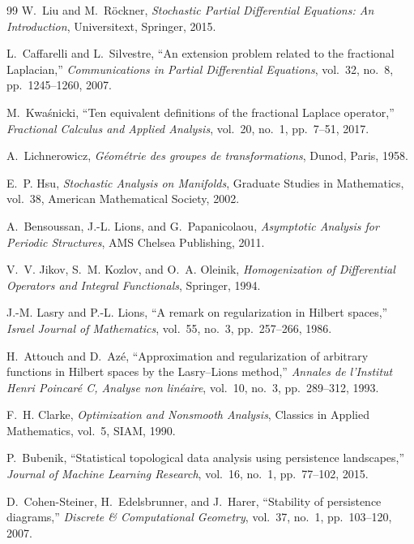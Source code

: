 \documentclass[11pt,a4paper,reqno]{article}
\theoremstyle{definition}
\theoremstyle{remark}
\begin{document}
\begin{thebibliography}{99}
W.~Liu and M.~R\"ockner,
\emph{Stochastic Partial Differential Equations: An Introduction},
Universitext, Springer, 2015.

L.~Caffarelli and L.~Silvestre,
``An extension problem related to the fractional Laplacian,''
\emph{Communications in Partial Differential Equations}, vol.~32, no.~8, pp.~1245--1260, 2007.

M.~Kwa\'snicki,
``Ten equivalent definitions of the fractional Laplace operator,''
\emph{Fractional Calculus and Applied Analysis}, vol.~20, no.~1, pp.~7--51, 2017.

A.~Lichnerowicz,
\emph{G\'eom\'etrie des groupes de transformations},
Dunod, Paris, 1958.

E.~P. Hsu,
\emph{Stochastic Analysis on Manifolds},
Graduate Studies in Mathematics, vol.~38, American Mathematical Society, 2002.

A.~Bensoussan, J.-L. Lions, and G.~Papanicolaou,
\emph{Asymptotic Analysis for Periodic Structures},
AMS Chelsea Publishing, 2011.

V.~V. Jikov, S.~M. Kozlov, and O.~A. Oleinik,
\emph{Homogenization of Differential Operators and Integral Functionals},
Springer, 1994.

J.-M. Lasry and P.-L. Lions,
``A remark on regularization in Hilbert spaces,''
\emph{Israel Journal of Mathematics}, vol.~55, no.~3, pp.~257--266, 1986.

H.~Attouch and D.~Az\'e,
``Approximation and regularization of arbitrary functions in Hilbert spaces by the Lasry--Lions method,''
\emph{Annales de l'Institut Henri Poincar\'e C, Analyse non lin\'eaire}, vol.~10, no.~3, pp.~289--312, 1993.

F.~H. Clarke,
\emph{Optimization and Nonsmooth Analysis},
Classics in Applied Mathematics, vol.~5, SIAM, 1990.

P.~Bubenik,
``Statistical topological data analysis using persistence landscapes,''
\emph{Journal of Machine Learning Research}, vol.~16, no.~1, pp.~77--102, 2015.

D.~Cohen-Steiner, H.~Edelsbrunner, and J.~Harer,
``Stability of persistence diagrams,''
\emph{Discrete \& Computational Geometry}, vol.~37, no.~1, pp.~103--120, 2007.


\end{thebibliography}
\end{document}
